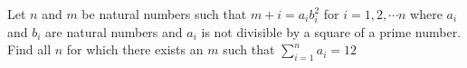 Let $n$ and $m$ be natural numbers such that $m+ i=a_ib_i^2$ for $i=1,2, \cdots n$ where $a_i$ and $b_i$ are natural numbers and $a_i$ is not divisible by a square of a prime number.
Find all $n$ for which there exists an $m$ such that
$\sum_{i=1}^{n}a_i=12$